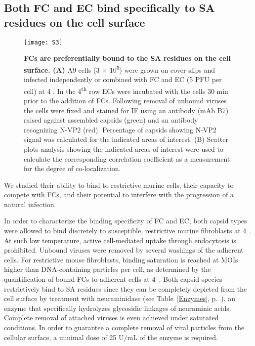 \subsection{Both FC and EC bind specifically to SA residues on the cell surface}


\begin{figure}
\centering
  \texttt{[image: S3]}
  \caption[Purification and analysis of FC and EC.]
   {\textbf{FCs are preferentially bound to the SA residues on the cell surface. (A)} A9 cells (3 $\times$ 10\textsuperscript{5}) were grown on cover slips and infected independently or combined with FC and EC (5 PFU per cell) at 4 \textcelsius. In the 4\textsuperscript{th} row ECs were incubated with the cells 30 min prior to the addition of FCs. Following removal of unbound viruses the cells were fixed and stained for IF using an antibody (mAb B7) raised against assembled capsids (green) and an antibody recognizing N-VP2 (red). Percentage of capsids showing N-VP2 signal was calculated for the indicated areas of interest. (B) Scatter plots analysis showing the indicated areas of interest were used to calculate the corresponding correlation coefficient as a measurement for the degree of co-localization.} 
\label{S3}
\end{figure}

We studied their ability to bind to restrictive murine cells, their capacity to compete with FCs, and their potential to interfere with the progression of a natural infection.   


In order to characterize the binding specificity of FC and EC, both capsid types were allowed to bind discretely to susceptible, restrictive murine fibroblasts at 4~\textcelsius. At such low temperature, active cell-mediated uptake through endocytosis is prohibited. Unbound viruses were removed by several washings of the adherent cells. For restrictive mouse fibroblasts, binding saturation is reached at MOIs higher than  DNA-containing particles per cell, as determined by the quantification of bound FCs to adherent cells at 4~\textcelsius. Both capsid species restrictively bind to SA residues since they can be completely depleted from the cell surface by treatment with neuraminidase (see Table~\ref{Enzymes}, p.~\pageref{Enzymes}), an enzyme that specifically hydrolyzes glycosidic linkages of neuraminic acids. Complete removal of attached viruses is even achieved under saturated conditions. In order to guarantee a complete removal of viral particles from the cellular surface, a minimal dose of 25 U/mL of the enzyme is required.   

